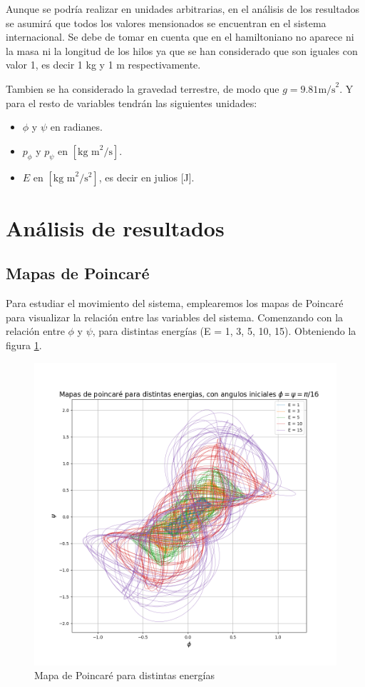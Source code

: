 \documentclass[11pt, twoside]{article} %
\begin{document}
Aunque se podría realizar en unidades arbitrarias, en el análisis 
de los resultados se asumirá que todos los valores mensionados se 
encuentran en el sistema internacional. Se debe de tomar en cuenta que 
en el hamiltoniano no aparece ni la masa ni la longitud de los hilos 
ya que se han considerado que son iguales con valor 1, es decir 1 kg y 
1 m respectivamente. 

Tambien se ha considerado la gravedad terrestre, de modo que 
$g = 9.81 \text{m/s}^2$. Y para el resto de variables tendrán las 
siguientes unidades:

\begin{itemize}
    \item $\phi$ y $\psi$ en radianes.
    \item $p_\phi$ y $p_\psi$ en $[\text{kg m}^2/\text{s}]$.
    \item $E$ en $[\text{kg m}^2/\text{s}^2]$, es decir en julios [J].
\end{itemize}

\section{Análisis de resultados}

\subsection{Mapas de Poincaré}

Para estudiar el movimiento del sistema, emplearemos los mapas de 
Poincaré para visualizar la relación entre las variables del sistema. 
Comenzando con la relación entre $\phi$ y $\psi$, para distintas 
energías (E = 1, 3, 5, 10, 15). Obteniendo la figura 
\ref{fig:poincare_energias}.

\begin{figure}[h!]
    \centering
    \includegraphics[width=\textwidth]{plots/poincare_energias.png}
    \caption{Mapa de Poincaré para distintas energías}
    \label{fig:poincare_energias}
\end{figure}
\end{document}
